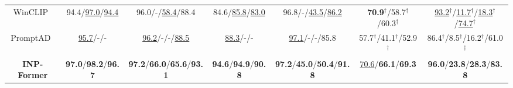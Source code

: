 \documentclass[letterpaper]{article} %
\begin{document}
\begin{table*}[]
{{\begin{tabular}{c|cccccc}
WinCLIP~\cite{WinClip}             & 94.4/\underline{97.0}/\underline{94.4} & \multicolumn{1}{c|}{96.0/-/\underline{58.4}/88.4}                            & 84.6/\underline{85.8}/\underline{83.0} & \multicolumn{1}{c|}{96.8/-/\underline{43.5}/\underline{86.2}}                            & \textbf{70.9}$^{\dagger}$/58.7$^{\dagger}$/60.3$^{\dagger}$ & \underline{93.2}$^{\dagger}$/\underline{11.7}$^{\dagger}$/\underline{18.3}$^{\dagger}$/\underline{74.7}$^{\dagger}$ \\
PromptAD~\cite{PromptAD}            & \underline{95.7}/-/-       & \multicolumn{1}{c|}{\underline{96.2}/-/-/\underline{88.5}}                               & \underline{88.3}/-/-       & \multicolumn{1}{c|}{\underline{97.1}/-/-/85.8}                               & 57.7$^{\dagger}$/41.1$^{\dagger}$/52.9$^{\dagger}$ & 86.4$^{\dagger}$/8.5$^{\dagger}$/16.2$^{\dagger}$/61.0$^{\dagger}$  \\ \midrule
\rowcolor{Light} 
\textbf{INP-Former} & \textbf{97.0}/\textbf{98.2}/\textbf{96.7} & \multicolumn{1}{c|}{\cellcolor{Light}\textbf{97.2}/\textbf{66.0}/\textbf{65.6}/\textbf{93.1}} & \textbf{94.6}/\textbf{94.9}/\textbf{90.8} & \multicolumn{1}{c|}{\cellcolor{Light}\textbf{97.2}/\textbf{45.0}/\textbf{50.4}/\textbf{91.8}} & \underline{70.6}/\textbf{66.1}/\textbf{69.3} & \textbf{96.0}/\textbf{23.8}/\textbf{28.3}/\textbf{83.8} \\ \bottomrule[1.5pt]
\end{tabular}}}
\end{table*}



\begin{table*}[]
\centering
\caption{\textbf{Zero-shot} anomaly detection performance on different AD datasets. The best in \textbf{bold}.}
\label{table:zero-shot-performance}
\fontsize{10}{14}
\end{table*}
\end{document}

